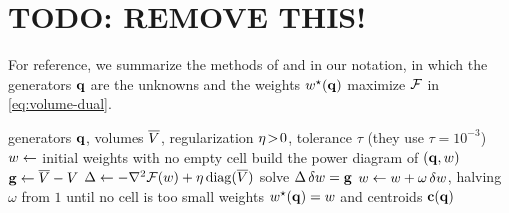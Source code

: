 \documentclass[main.tex]{subfiles}
\begin{document}
\section{TODO: REMOVE THIS!}
\label{sec:appendix-prior}

For reference, we summarize the methods of \citet{Bourne2025Inverting} and \citet{Bourne2026ConvexOrder} in our notation, in which the generators $\mathbf{q}$ are the unknowns and the weights $w^\star(\mathbf{q})$ maximize $\mathcal{F}$ in \eqref{eq:volume-dual}.

\begin{algorithm}[H]
  \caption{Volume solve of \citet{Bourne2025Inverting}, used by Algorithms~\ref{alg:bourne2025}--\ref{alg:bourne2026-fw}.}
  \label{alg:bourne-volume}
  \begin{algorithmic}[1]
    \Require generators $\mathbf{q}$, volumes $\overline{V}$, regularization $\eta \!>\! 0$, tolerance $\tau$ (they use $\tau \!=\! 10^{-3}$)
    \State $w \gets$ initial weights with no empty cell
    \Repeat
      \State build the power diagram of $(\mathbf{q}, w)$ \Comment{\eqref{eq:power-cell}}
      \State $\mathbf{g} \gets \overline{V} - V$ \Comment{\eqref{eq:volume-dual-gradient}}
      \State $\Delta \gets -\nabla^2\mathcal{F}(w) + \eta\,\mathrm{diag}(\overline{V})$ \Comment{\eqref{eq:newton-step}}
      \State solve $\Delta\,\delta w = \mathbf{g}$
      \State $w \gets w + \omega\,\delta w$, halving $\omega$ from $1$ until no cell is too small
    \State \Return weights $w^\star(\mathbf{q}) = w$ and centroids $\mathbf{c}(\mathbf{q})$
  \end{algorithmic}
\end{algorithm}
\end{document}

